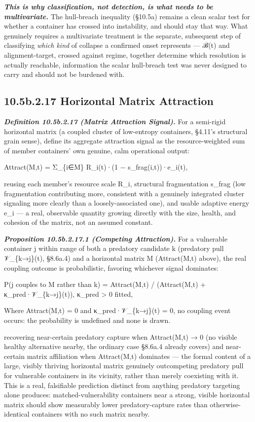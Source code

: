 \documentclass[
]{article}
\begin{document}
\emph{\textbf{This is why classification, not detection, is what needs
to be multivariate.}} The hull-breach inequality (§10.5a) remains a
clean scalar test for whether a container has crossed into instability,
and should stay that way. What genuinely requires a multivariate
treatment is the separate, subsequent step of classifying \emph{which
kind} of collapse a confirmed onset represents --- ℬ(t) and
alignment-target, crossed against regime, together determine which
resolution is actually reachable, information the scalar hull-breach
test was never designed to carry and should not be burdened with.

\hypertarget{b.2.17-horizontal-matrix-attraction}{%
\subsection{10.5b.2.17 Horizontal Matrix
Attraction}\label{b.2.17-horizontal-matrix-attraction}}

\emph{\textbf{Definition 10.5b.2.17 (Matrix Attraction Signal).}} For a
semi-rigid horizontal matrix (a coupled cluster of low-entropy
containers, §4.11's structural grain sense), define its aggregate
attraction signal as the resource-weighted sum of member containers' own
genuine, calm operational output:

Attract(M,t) = Σ\_\{i∈M\} R\_i(t)·(1 − s\_frag(i,t))·e\_i(t),

reusing each member's resource scale R\_i, structural fragmentation
s\_frag (low fragmentation contributing more, consistent with a
genuinely integrated cluster signaling more clearly than a
loosely-associated one), and usable adaptive energy e\_i --- a real,
observable quantity growing directly with the size, health, and cohesion
of the matrix, not an assumed constant.

\emph{\textbf{Proposition 10.5b.2.17.1 (Competing Attraction).}} For a
vulnerable container j within range of both a predatory candidate k
(predatory pull 𝒱\_\{k→j\}(t), §8.6a.4) and a horizontal matrix M
(Attract(M,t) above), the real coupling outcome is probabilistic,
favoring whichever signal dominates:

P(j couples to M rather than k) = Attract(M,t) / (Attract(M,t) +
κ\_pred·𝒱\_\{k→j\}(t)), κ\_pred \textgreater{} 0 fitted,

Where Attract(M,t) = 0 and κ\_pred·𝒱\_\{k→j\}(t) = 0, no coupling event
occurs: the probability is undefined and none is drawn.

recovering near-certain predatory capture when Attract(M,t) → 0 (no
visible healthy alternative nearby, the ordinary case §8.6a.4 already
covers) and near-certain matrix affiliation when Attract(M,t) dominates
--- the formal content of a large, visibly thriving horizontal matrix
genuinely outcompeting predatory pull for vulnerable containers in its
vicinity, rather than merely coexisting with it. This is a real,
falsifiable prediction distinct from anything predatory targeting alone
produces: matched-vulnerability containers near a strong, visible
horizontal matrix should show measurably lower predatory-capture rates
than otherwise-identical containers with no such matrix nearby.
\end{document}
